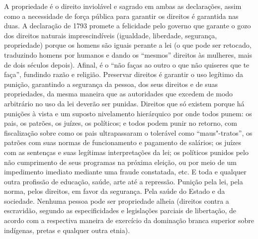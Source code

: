 A propriedade é o direito inviolável e sagrado em ambas as declarações,
assim como a necessidade de força pública para garantir os direitos é
garantida nas duas. A declaração de 1793 promete a felicidade pelo
governo que garante o gozo dos direitos naturais imprescindíveis
(igualdade, liberdade, segurança, propriedade) porque os homens são
iguais perante a lei (o que pode ser retocado, traduzindo homens por
humanos e dando os ``mesmos'' direitos às mulheres, mais de dois séculos
depois). Afinal, é o ``não faças ao outro o que não quiseres que te
faça'', fundindo razão e religião. Preservar direitos é garantir o uso
legítimo da punição, garantindo a segurança da pessoa, dos seus direitos
e de suas propriedades, da mesma maneira que as autoridades que excedem
de modo arbitrário no uso da lei deverão ser punidas. Direitos que só
existem porque há punições à vista e um suposto nivelamento hierárquico
por onde todos punem: os pais, os patrões, os juízes, os políticos; e
todos podem punir no retorno, com fiscalização sobre como os pais
ultrapassaram o tolerável como ``maus"-tratos'', os patrões com suas
normas de funcionamento e pagamento de salários; os juízes com as
sentenças e suas legítimas interpretações da lei; os políticos punidos
pelo não cumprimento de seus programas na próxima eleição, ou por meio
de um impedimento imediato mediante uma fraude constatada, etc. E toda e
qualquer outra profissão de educação, saúde, arte até a repressão.
Punição pela lei, pela norma, pelos direitos, em favor da segurança.
Pela saúde do Estado e da sociedade. Nenhuma pessoa pode ser propriedade
alheia (direitos contra a escravidão, segundo as especificidades e
legislações parciais de libertação, de acordo com a respectiva maneira
de exercício da dominação branca superior sobre indígenas, pretas e
qualquer outra etnia).

